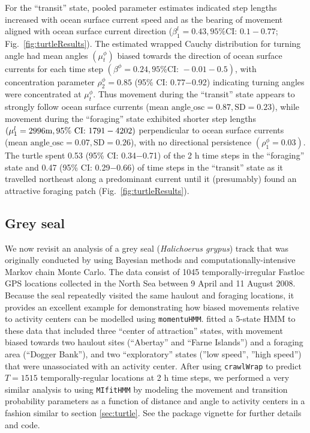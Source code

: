 \documentclass[12pt]{article}\usepackage[]{graphicx}\usepackage[]{color}
\begin{document}
For the ``transit'' state, pooled parameter estimates indicated step lengths increased with ocean surface current speed and as the bearing of movement aligned with ocean surface current direction ($\beta^l_1=0.43, \text{95\% CI: } 0.1-0.77$; Fig.\ \ref{fig:turtleResults}). The estimated wrapped Cauchy distribution for turning angle had mean angles $(\mu^\phi_t)$ biased towards the direction of ocean surface currents for each time step $(\beta^\phi=0.24, \text{95\% CI: } -0.01-0.5)$, with concentration parameter $\rho^\phi_2=0.85$ (95\% CI: 0.77$-$0.92) indicating turning angles were concentrated at $\mu^\phi_t$. Thus movement during the ``transit'' state appears to strongly follow ocean surface currents (mean $\text{angle\_osc}=0.87,\text{SD}=0.23$), while movement during the ``foraging'' state exhibited shorter step lengths $(\mu^l_1=2996{\text m}, \text{95\% CI: } 1791-4202)$ perpendicular to ocean surface currents (mean $\text{angle\_osc}=0.07,\text{SD}=0.26$), with no directional persistence $(\rho^\phi_1=0.03)$. The turtle spent 0.53 (95\% CI: 0.34$-$0.71) of the 2 h time steps in the ``foraging'' state and 0.47 (95\% CI: 0.29$-$0.66) of time steps in the ``transit'' state as it travelled northeast along a predominant current until it (presumably) found an attractive foraging patch (Fig.\ \ref{fig:turtleResults}).

\subsection{Grey seal}
\label{sec:greySeal}
We now revisit an analysis of a grey seal ({\it Halichoerus grypus}) track that was originally conducted by \cite{McClintockEtAl2012} using Bayesian methods and computationally-intensive Markov chain Monte Carlo. The data consist of 1045 temporally-irregular Fastloc GPS locations collected in the North Sea between 9 April and 11 August 2008. Because the seal repeatedly visited the same haulout and foraging locations, it provides an excellent example for demonstrating how biased movements relative to activity centers can be modelled using \verb|momentuHMM|. \cite{McClintockEtAl2012} fitted a 5-state HMM to these data that included three ``center of attraction'' states, with movement biased towards two haulout sites (``Abertay'' and ``Farne Islands'') and a foraging area (``Dogger Bank''), and two ``exploratory'' states (''low speed'', ''high speed'') that were unassociated with an activity center. After using \verb|crawlWrap| to predict $T=1515$ temporally-regular locations at 2 h time steps, we performed a very similar analysis to \cite{McClintockEtAl2012} using \verb|MIfitHMM| by modeling the movement and transition probability parameters as a function of distance and angle to activity centers in a fashion similar to section \ref{sec:turtle}. See the package vignette for further details and code.
\end{document}
